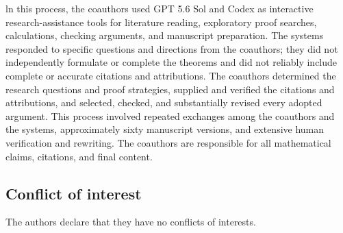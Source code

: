 \documentclass[11pt]{article}
\numberwithin{equation}{section}
\theoremstyle{remark}
\begin{document}
ln this process, the coauthors used GPT 5.6 Sol and Codex as interactive research-assistance tools for literature reading, exploratory proof searches, calculations, checking arguments, and manuscript preparation. The systems responded to specific questions and directions from the coauthors; they did not independently formulate or complete the theorems and did not reliably include complete or accurate citations and attributions. The coauthors determined the research questions and proof strategies, supplied and verified the citations and attributions, and selected, checked, and substantially revised every adopted argument. This process involved repeated exchanges among the coauthors and the systems, approximately sixty manuscript versions, and extensive human verification and rewriting. The coauthors are responsible for all mathematical claims, citations, and final content. 

\subsection*{Conflict of interest} 

The authors declare that they have no conflicts of interests. 

\end{document}
